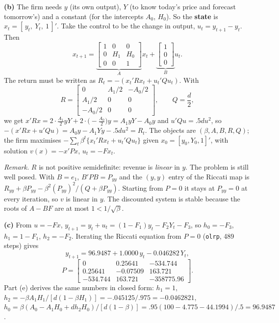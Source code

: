 \documentclass[12pt, letterpaper]{article}
\begin{document}
\begin{tcolorbox}[oddbox,title={Exercise 7.1 \quad A competitive firm}]
\textbf{(b)} The firm needs $y$ (its own output), $Y$ (to know today's price and forecast tomorrow's)
and a constant (for the intercepts $A_0$, $H_0$). So the \textbf{state} is
$x_t=[\,y_t,\ Y_t,\ 1\,]'$. Take the control to be the change in output, $u_t=y_{t+1}-y_t$. Then
\[
x_{t+1}=\underbrace{\begin{bmatrix}1&0&0\\0&H_1&H_0\\0&0&1\end{bmatrix}}_{A}x_t
+\underbrace{\begin{bmatrix}1\\0\\0\end{bmatrix}}_{B}u_t .
\]
The return must be written as $R_t=-(x_t'Rx_t+u_t'Qu_t)$. With
\[
R=\begin{bmatrix}0&A_1/2&-A_0/2\\A_1/2&0&0\\-A_0/2&0&0\end{bmatrix},\qquad Q=\frac d2,
\]
we get $x'Rx=2\cdot\frac{A_1}{2}yY+2\cdot\big(-\frac{A_0}{2}\big)y=A_1yY-A_0y$ and $u'Qu=.5du^2$, so
$-(x'Rx+u'Qu)=A_0y-A_1Yy-.5du^2=R_t$. \checkmark{} The objects are $(\beta,A,B,R,Q)$; the firm
maximises $-\sum_t\beta^t\{x_t'Rx_t+u_t'Qu_t\}$ given $x_0=[y_0,Y_0,1]'$, with solution
$v(x)=-x'Px$, $u_t=-Fx_t$.

\emph{Remark.} $R$ is not positive semidefinite: revenue is \emph{linear} in $y$. The problem is
still well posed. With $B=e_1$, $B'PB=P_{yy}$ and the $(y,y)$ entry of the Riccati map is
$R_{yy}+\beta P_{yy}-\beta^2(P_{yy})^2/(Q+\beta P_{yy})$. Starting from $P=0$ it stays at
$P_{yy}=0$ at every iteration, so $v$ is linear in $y$. The discounted system is stable because the
roots of $A-BF$ are at most $1<1/\sqrt\beta$.

\textbf{(c)} From $u=-Fx$, $y_{t+1}=y_t+u_t=(1-F_1)y_t-F_2Y_t-F_3$, so $h_0=-F_3$,
$h_1=1-F_1$, $h_2=-F_2$. Iterating the Riccati equation from $P=0$ (\texttt{olrp}, 489 steps) gives
\[
\boxed{y_{t+1}=96.9487+1.0000\,y_t-0.046282\,Y_t,}
\]
\[
P=\begin{bmatrix}0&0.25641&-534.744\\0.25641&-0.07509&163.721\\-534.744&163.721&-358775.96\end{bmatrix}.
\]
Part (e) derives the same numbers in closed form:
$h_1=1$, $h_2=-\beta A_1H_1/[d(1-\beta H_1)]=-.045125/.975=-0.0462821$,
$h_0=\beta(A_0-A_1H_0+dh_2H_0)/[d(1-\beta)]=.95(100-4.775-44.1994)/.5=96.9487$.


\end{tcolorbox}
\end{document}
